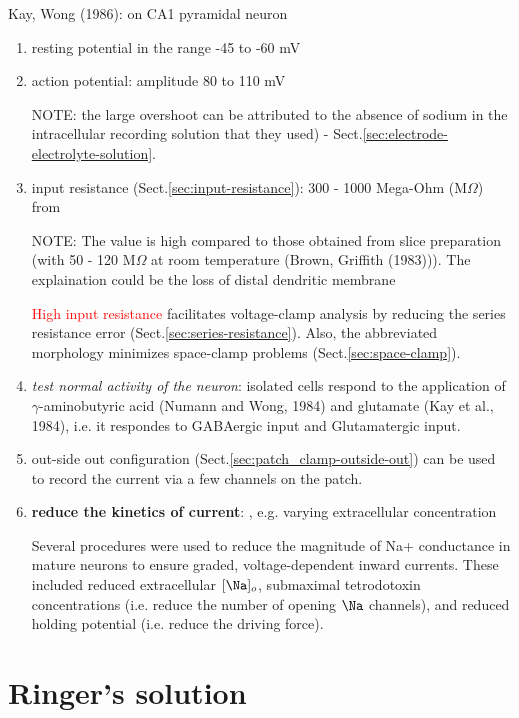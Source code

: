 Kay, Wong (1986): on CA1 pyramidal neuron
\begin{enumerate}
  \item resting potential in the range -45 to -60 mV

  \item action potential: amplitude 80 to 110 mV

NOTE: the large overshoot can be attributed to the absence of sodium in the
intracellular recording solution that they used) -
Sect.\ref{sec:electrode-electrolyte-solution}.

  \item input resistance (Sect.\ref{sec:input-resistance}): 300 - 1000 Mega-Ohm
  (M$\Omega$) from

NOTE: The value is high compared to those obtained from slice preparation (with
50 - 120 M$\Omega$ at room temperature (Brown, Griffith (1983))). The
explaination could be the loss of distal dendritic membrane

\textcolor{red}{High input resistance} facilitates voltage-clamp analysis by
reducing the series resistance error (Sect.\ref{sec:series-resistance}).
Also, the abbreviated morphology minimizes space-clamp problems
(Sect.\ref{sec:space-clamp}).

  \item {\it test normal activity of the neuron}: isolated cells respond to the
  application of $\gamma$-aminobutyric acid (Numann and Wong, 1984) and
  glutamate (Kay et al., 1984), i.e. it respondes to GABAergic input and
  Glutamatergic input.

  \item out-side out configuration (Sect.\ref{sec:patch_clamp-outside-out}) can
  be used to record the current via a few channels on the patch.

  \item {\bf reduce the kinetics of current}: , e.g. varying extracellular
  concentration

Several procedures were used to reduce the magnitude of Na+ conductance in
mature neurons to ensure graded, voltage-dependent inward currents. These
included reduced extracellular $[\Na]_o$, submaximal tetrodotoxin concentrations
(i.e. reduce the number of opening $\Na$ channels), and reduced holding
potential (i.e. reduce the driving force).


\end{enumerate}

\section{Ringer's solution}
\label{sec:Ringer-solution}

